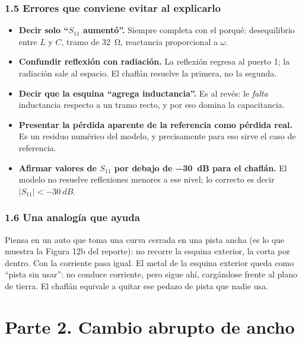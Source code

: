 \documentclass[11pt,letterpaper]{article}
\begin{document}
\section*{1.5 Errores que conviene evitar al explicarlo}
\begin{itemize}
\item \textbf{Decir solo ``$S_{11}$ aumentó''.} Siempre completa con el porqué: desequilibrio entre $L$ y $C$, tramo de \SI{32}{\ohm}, reactancia proporcional a $\omega$.
\item \textbf{Confundir reflexión con radiación.} La reflexión regresa al puerto 1; la radiación sale al espacio. El chaflán resuelve la primera, no la segunda.
\item \textbf{Decir que la esquina ``agrega inductancia''.} Es al revés: le \emph{falta} inductancia respecto a un tramo recto, y por eso domina la capacitancia.
\item \textbf{Presentar la pérdida aparente de la referencia como pérdida real.} Es un residuo numérico del modelo, y precisamente para eso sirve el caso de referencia.
\item \textbf{Afirmar valores de $S_{11}$ por debajo de \SI{-30}{dB} para el chaflán.} El modelo no resuelve reflexiones menores a ese nivel; lo correcto es decir $|S_{11}|<\SI{-30}{dB}$.
\end{itemize}

\section*{1.6 Una analogía que ayuda}
Piensa en un auto que toma una curva cerrada en una pista ancha (es lo que muestra la Figura 12b del reporte): no recorre la esquina exterior, la corta por dentro. Con la corriente pasa igual. El metal de la esquina exterior queda como ``pista sin usar'': no conduce corriente, pero sigue ahí, cargándose frente al plano de tierra. El chaflán equivale a quitar ese pedazo de pista que nadie usa.


\newpage
\part*{Parte 2. Cambio abrupto de ancho}
\end{document}
